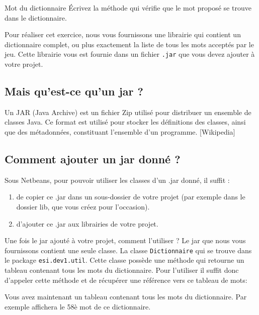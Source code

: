 \documentclass[a4paper,11pt]{article}
\begin{document}
 	\begin{Exercice}{Mot du dictionnaire}
 	 			\'Ecrivez la méthode 
		qui vérifie que le mot proposé se trouve dans le dictionnaire.
				
		Pour réaliser cet exercice, nous vous fournissons une librairie qui contient 
		un dictionnaire complet, ou plus exactement la liste de tous les mots
		acceptés par le jeu. Cette librairie vous est fournie dans un fichier
		 \texttt{.jar} que vous devez ajouter à votre projet.	
		 
		\begin{colxbox}	
		\subsection*{Mais qu’est-ce qu’un jar ?}
			Un JAR (Java Archive) est un fichier Zip utilisé pour distribuer un 
			ensemble de classes Java. Ce format est utilisé pour stocker les 
			définitions des classes, ainsi que des métadonnées, constituant 
			l’ensemble d’un programme. [Wikipedia]
			
		\subsection*{Comment ajouter un jar donné ?}

		Sous Netbeans, pour pouvoir utiliser les classes d’un .jar donné, il suffit :
		
		\begin{enumerate}
		 	\item de copier ce .jar dans un sous-dossier de votre projet (par exemple
				dans le dossier lib, que vous créez pour l’occasion).
			\item d’ajouter ce .jar aux librairies de votre projet.
		\end{enumerate}
	\end{colxbox}	

	Une fois le jar ajouté à votre projet, comment l'utiliser ?
			Le jar que nous vous fournissons contient une seule classe.
			La classe \texttt{Dictionnaire} qui se trouve dans le package 
			\texttt{esi.dev1.util}. Cette classe possède une méthode 
			 qui retourne un tableau contenant tous les mots
			du dictionnaire. Pour l'utiliser il suffit donc d'appeler cette méthode
			et de récupérer une référence vers ce tableau de mots:
			
			
			Vous avez maintenant un tableau contenant tous les mots du dictionnaire.
			Par exemple  affichera 
			le 58è mot de ce dictionnaire.

			
	\end{Exercice} 
\end{document}
